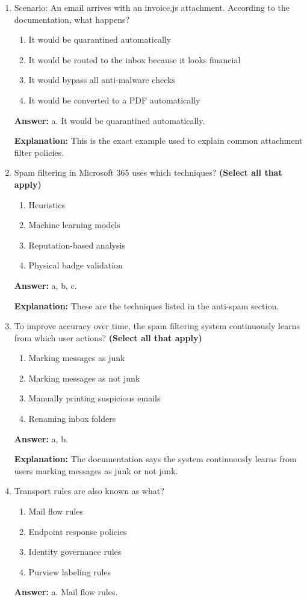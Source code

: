 \documentclass[10pt]{article}
\begin{document}
\begin{enumerate}[leftmargin=*]
\item Scenario: An email arrives with an invoice.js attachment. According to the documentation, what happens?
\begin{enumerate}[label=\alph*., leftmargin=1.5em]
\item It would be quarantined automatically
\item It would be routed to the inbox because it looks financial
\item It would bypass all anti-malware checks
\item It would be converted to a PDF automatically
\end{enumerate}
\textbf{Answer:} a. It would be quarantined automatically.

\textbf{Explanation:} This is the exact example used to explain common attachment filter policies.

\item Spam filtering in Microsoft 365 uses which techniques? \textbf{(Select all that apply)}
\begin{enumerate}[label=\alph*., leftmargin=1.5em]
\item Heuristics
\item Machine learning models
\item Reputation-based analysis
\item Physical badge validation
\end{enumerate}
\textbf{Answer:} a, b, c.

\textbf{Explanation:} These are the techniques listed in the anti-spam section.

\item To improve accuracy over time, the spam filtering system continuously learns from which user actions? \textbf{(Select all that apply)}
\begin{enumerate}[label=\alph*., leftmargin=1.5em]
\item Marking messages as junk
\item Marking messages as not junk
\item Manually printing suspicious emails
\item Renaming inbox folders
\end{enumerate}
\textbf{Answer:} a, b.

\textbf{Explanation:} The documentation says the system continuously learns from users marking messages as junk or not junk.

\item Transport rules are also known as what?
\begin{enumerate}[label=\alph*., leftmargin=1.5em]
\item Mail flow rules
\item Endpoint response policies
\item Identity governance rules
\item Purview labeling rules
\end{enumerate}
\textbf{Answer:} a. Mail flow rules.


\end{enumerate}
\end{document}
